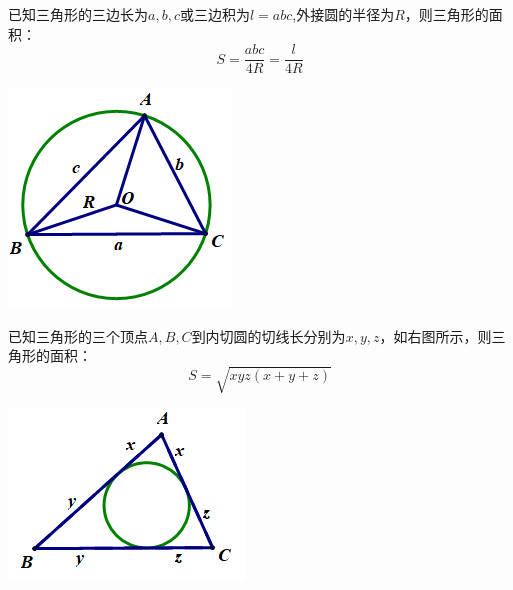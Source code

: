 \documentclass[10pt]{ctexart}
\begin{document}
\begin{minipage}[t]{0.7\textwidth}
\begin{dkli}{}{}
已知三角形的三边长为$a,b,c$或三边积为$l=abc$,外接圆的半径为$R$，则三角形的面积：
\[S=\dfrac{abc}{4R}=\dfrac{l}{4R}\]
\end{dkli}
\end{minipage}
\begin{minipage}[t]{0.3\textwidth}
\qquad\includegraphics[scale=0.5]{figure/mj-06.png}
\end{minipage}

\begin{minipage}[t]{0.7\textwidth}
\begin{dkli}{}{}
已知三角形的三个顶点$A,B,C$到内切圆的切线长分别为$x,y,z$，如右图所示，则三角形的面积：
\[S=\sqrt{xyz(x+y+z)}\]
\end{dkli}
\end{minipage}
\begin{minipage}[t]{0.3\textwidth}
\includegraphics[scale=0.6]{figure/mj-07.png}
\end{minipage}
\end{document}
